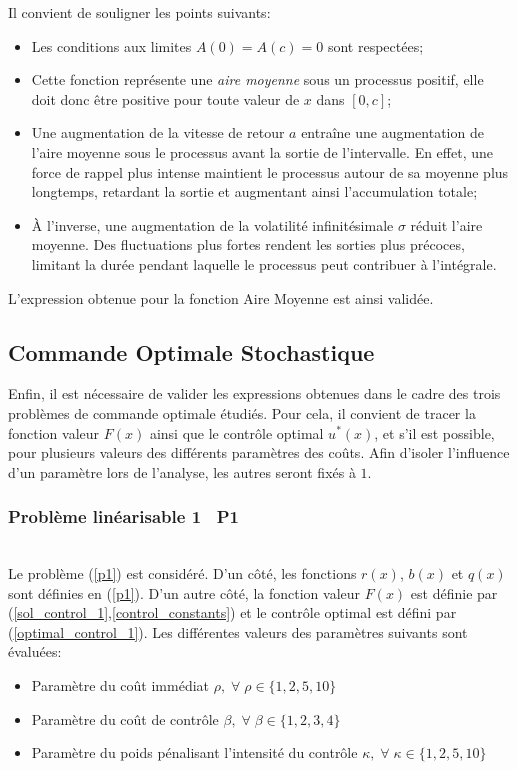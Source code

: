Il convient de souligner les points suivants:
\begin{itemize}
    \item Les conditions aux limites $A(0)=A(c)=0$ sont respectées;
    \item Cette fonction représente une \textit{aire moyenne} sous un processus positif, elle doit donc être positive pour toute valeur de $x$ dans $[0,c]$;
    \item Une augmentation de la vitesse de retour $a$ entraîne une augmentation de l'aire moyenne sous le processus avant la sortie de l'intervalle. En effet, une force de rappel plus intense maintient le processus autour de sa moyenne plus longtemps, retardant la sortie et augmentant ainsi l'accumulation totale;
    \item À l'inverse, une augmentation de la volatilité infinitésimale $\sigma$ réduit l'aire moyenne. Des fluctuations plus fortes rendent les sorties plus précoces, limitant la durée pendant laquelle le processus peut contribuer à l'intégrale.
\end{itemize}

L'expression obtenue pour la fonction Aire Moyenne est ainsi validée.

\subsection{Commande Optimale Stochastique}

Enfin, il est nécessaire de valider les expressions obtenues dans le cadre des trois problèmes de commande optimale étudiés. Pour cela, il convient de tracer la fonction valeur $F(x)$ ainsi que le contrôle optimal $u^*(x)$, et s'il est possible, pour plusieurs valeurs des différents paramètres des coûts. Afin d'isoler l'influence d'un paramètre lors de l'analyse, les autres seront fixés à $1$.

\subsubsection{Problème linéarisable 1 \textemdash~P1}\phantom{}\\
Le problème (\ref{p1}) est considéré. D'un côté, les fonctions $r(x)$, $b(x)$ et $q(x)$ sont définies en (\ref{p1}). D'un autre côté, la fonction valeur $F(x)$ est définie par (\ref{sol_control_1},\ref{control_constants}) et le contrôle optimal est défini par (\ref{optimal_control_1}). Les différentes valeurs des paramètres suivants sont évaluées:
\begin{itemize}
    \item Paramètre du coût immédiat $\rho,\;\forall\;\rho\in\{1,2,5,10\}$
    \item Paramètre du coût de contrôle $\beta,\;\forall\;\beta\in\{1,2,3,4\}$
    \item Paramètre du poids pénalisant l'intensité du contrôle $\kappa,\;\forall\;\kappa\in\{1,2,5,10\}$
\end{itemize}

